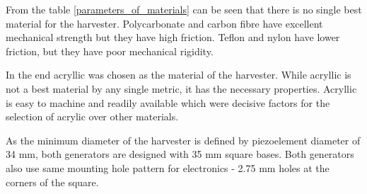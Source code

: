 \begin{table}[htb]
\caption{\label{parameters_of_materials} Materials for the shaft of generator \cite{PlasticsInternational2015}, \cite{Etra}, \cite{Goodfellow} \cite{McCarr}.}
\begin{center}

\end{center}
\end{table}

From the table \ref{parameters_of_materials} can be seen that there is no single best material for the harvester. Polycarbonate and carbon fibre  have excellent mechanical strength but they have high friction. Teflon and nylon have lower friction, but they have poor mechanical rigidity. 

In the end acryllic was chosen as the material of the harvester. While acryllic is not a best material by any single metric, it has the necessary properties. Acryllic is easy to machine and readily available which were decisive factors for the selection of acrylic over other materials. 

As the minimum diameter of the harvester is defined by piezoelement diameter of 34 mm, both generators are designed with 35 mm square bases. Both generators also use same mounting hole pattern for electronics - 2.75 mm holes at the corners of the square.

